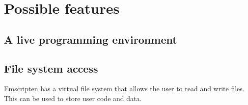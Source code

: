 \section{Possible features}
\subsection{A live programming environment}


\subsection{File system access}
Emscripten has a virtual file system that allows the user to read and write files. This can be used to store user code and data.


